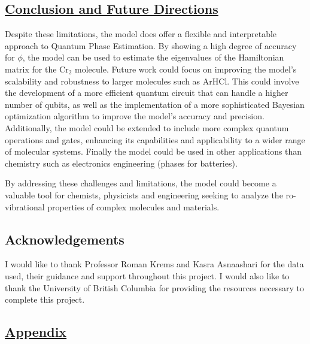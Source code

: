 \documentclass[
]{article}
\begin{document}
\subsection*{\texorpdfstring{\underline{Conclusion and Future Directions}}{}}\label{section-7}

Despite these limitations, the model does offer a flexible and
interpretable approach to Quantum Phase Estimation. By showing a high
degree of accuracy for \(\phi\), the model can be used to estimate the
eigenvalues of the Hamiltonian matrix for the Cr\(_2\) molecule. Future
work could focus on improving the model's scalability and robustness to
larger molecules such as ArHCl. This could involve the development of a
more efficient quantum circuit that can handle a higher number of
qubits, as well as the implementation of a more sophisticated Bayesian
optimization algorithm to improve the model's accuracy and precision.
Additionally, the model could be extended to include more complex
quantum operations and gates, enhancing its capabilities and
applicability to a wider range of molecular systems. Finally the model
could be used in other applications than chemistry such as electronics
engineering (phases for batteries).

By addressing these challenges and limitations, the model could become a
valuable tool for chemists, physicists and engineering seeking to
analyze the ro-vibrational properties of complex molecules and
materials.




\subsection*{Acknowledgements}\label{acknowledgements}

I would like to thank Professor Roman Krems and Kasra Asnaashari for the
data used, their guidance and support throughout this project. I would
also like to thank the University of British Columbia for providing the
resources necessary to complete this project.

\subsection*{\texorpdfstring{\underline{Appendix}}{}}\label{section-8}
\end{document}
